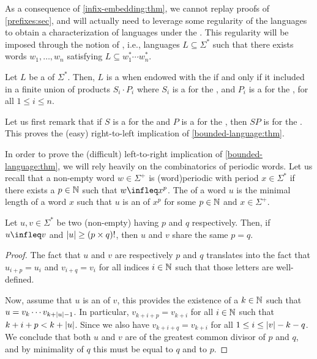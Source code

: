 \AP As a consequence of \cref{infix-embedding:thm}, we cannot replay
proofs of \cref{prefixes:sec}, and will
actually need to leverage some regularity of the languages to obtain a
characterization of  languages under the . This regularity will be imposed through the notion of , i.e., languages $L \subseteq \Sigma^*$ such that there exists words
$w_1, \dots, w_n$ satisfying $L \subseteq w_1^* \cdots w_n^*$.

\begin{theorem}
    \label{bounded-language:thm}
    Let $L$ be a  of $\Sigma^*$. Then,
    $L$ is a  when endowed with the 
     if and only if it included in a finite union of 
    products $S_i \cdot P_i$ where 
    $S_i$ is a  for the , and 
    $P_i$ is a  for the ,
    for all $1 \leq i \leq n$.
\end{theorem}

Let us first remark that if $S$ is a  for the 
and $P$ is a  for the , then $SP$ is
 for the . This proves the (easy)
right-to-left implication of \cref{bounded-language:thm}.

\AP In order to prove the (difficult) left-to-right implication of
\cref{bounded-language:thm}, we will rely heavily on the
combinatorics of periodic words. Let us recall that a non-empty word $w \in
\Sigma^+$ is \intro(word){periodic} with period $x \in \Sigma^*$ if there
exists a $p \in \mathbb{N}$ such that $w \infleq x^p$. The  of
a word $u$ is the minimal length of a word $x$ such that $u$ is an 
of $x^p$ for some $p \in \mathbb{N}$ and $x \in \Sigma^+$.

\begin{lemma}
    \label{periodic-infixes:lem}
    Let $u,v \in \Sigma^*$ be two (non-empty) 
    having  $p$ and $q$ respectively.
    Then, if $u \infleq v$ and $\card{u} \geq \factorial[p]{p \times q}$,
    then $u$ and $v$ share the same 
    $p = q$.
\end{lemma}
\begin{proof}
    The fact that $u$ and $v$ are 
    respectively $p$ and $q$ translates into the fact that $u_{i+p} = u_i$ and
    $v_{i+q} = v_i$ for all indices $i \in \mathbb{N}$ such that those letters are
    well-defined.

    Now, assume that $u$ is an  of $v$, this provides the existence
    of a $k \in \mathbb{N}$ such that $u = v_{k} \cdots v_{k + \left| u \right| - 1}$. In
    particular, $v_{k+i+p} = v_{k+i}$ for all $i \in \mathbb{N}$ such that $k+i+p < k
    + \left| u \right|$. Since we also have $v_{k+i+q} = v_{k+i}$ for all $1 \leq i
    \leq \left| v \right| - k - q$. We conclude that both $u$ and $v$ are of
     the greatest common divisor of $p$ and $q$, and by
    minimality of $q$ this must be equal to $q$ and to $p$.
\end{proof}

